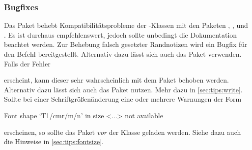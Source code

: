 \subsubsection{Bugfixes}
%
\begin{DeclarePackages}
  Das Paket behebt Kompatibilitätsprobleme der \KOMAScript-Klassen mit den 
  Paketen , ,  und
  . Es ist durchaus empfehlenswert, jedoch sollte unbedingt 
  die Dokumentation beachtet werden.
  Zur Behebung falsch gesetzter Randnotizen wird ein Bugfix für den Befehl 
   bereitgestellt. Alternativ dazu lässt sich auch das Paket 
   verwenden.
  Falls der Fehler
\begin{quoting}[rightmargin=0pt]
\end{quoting}
  erscheint, kann dieser sehr wahrscheinlich mit dem Paket  
  behoben werden. Alternativ dazu lässt sich auch das Paket 
   nutzen. Mehr dazu in \autoref{sec:tips:write}.
  Sollte bei einer Schriftgrößenänderung eine oder mehrere Warnungen der Form
\begin{quoting}[rightmargin=0pt]
\begin{Code}
Font shape `T1/cmr/m/n' in size <...> not available
\end{Code}
\end{quoting}
  erscheinen, so sollte das Paket  \emph{vor} der Klasse 
  geladen werden. Siehe dazu auch die Hinweise in \autoref{sec:tips:fontsize}.
\end{DeclarePackages}
